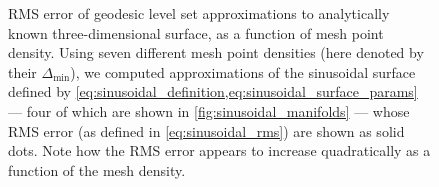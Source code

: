 \begin{figure}[htpb]
    \centering
    \caption[RMS error of geodesic level set approximations to analytically known
    three-dimensional surface, as a function of mesh point density]
    {RMS error of geodesic level set approximations to analytically known
    three-dimensional surface, as a function of mesh point density.
    Using seven different mesh point densities (here denoted by their
    $\Delta_{\min}$), we computed approximations of the sinusoidal surface
    defined by \cref{eq:sinusoidal_definition,eq:sinusoidal_surface_params} ---
    four of which are shown in \cref{fig:sinusoidal_manifolds} --- whose
    RMS error (as defined in \cref{eq:sinusoidal_rms}) are shown as solid
    dots. Note how the RMS error appears to increase quadratically
    as a function of the mesh density.
}
    \label{fig:sinusoidal_manifold_errors}
\end{figure}

